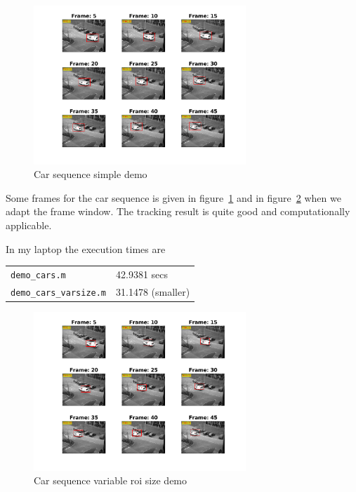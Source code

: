 \documentclass[a4paper,12pt]{article}
\begin{document}
\begin{figure}[h]
        \centering
        \includegraphics[width=8cm]{../Videos/demo_cars.png}
        \caption{Car sequence simple demo}
		\label{fig:demo2}
\end{figure}
\newpage
Some frames for the car sequence is given in figure~\ref{fig:demo2} and in figure~\ref{fig:demo3} when we adapt the frame window. The tracking result is quite good and computationally applicable.

\noindent In my laptop the execution times are

\begin{tabular}[h]{l l}
	\texttt{demo\_cars.m} & 42.9381 secs\\
	\texttt{demo\_cars\_varsize.m} & 31.1478 (smaller)\\  
\end{tabular}


 

\begin{figure}[ht]
        \centering
        \includegraphics[width=8cm]{../Videos/demo_cars_varsize.png}
        \caption{Car sequence variable roi size demo}
		\label{fig:demo3}
\end{figure}




\end{document}

